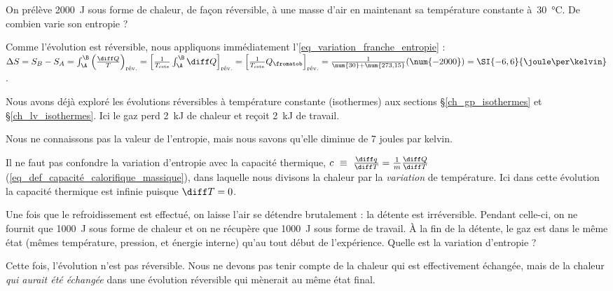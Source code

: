 		\begin{anexample}
		\label{exemple_delta_entropie_basics}
			On prélève \SI{2000}{\joule} sous forme de chaleur, de façon réversible, à une masse d’air en maintenant sa température constante à~\SI{30}{\degreeCelsius}. De combien varie son entropie ?
				\begin{answer}
					Comme l’évolution est réversible, nous appliquons immédiatement l’\cref{eq_variation_franche_entropie} : $\Delta S
						= S_B - S_A
						= \int_\A^\B \left( \frac{\diff Q}{T} \right)_\text{rév.}
						= \left[\frac{1}{T_\text{cste}} \int_\A^\B \diff Q \right]_\text{rév.}
						= \left[\frac{1}{T_\text{cste}} Q_\fromatob \right]_\text{rév.}
						= \frac{1}{\num{30} + \num{273,15}} (\num{-2000})
						= \SI{-6,6}{\joule\per\kelvin}$.
					\begin{remark}Nous avons déjà exploré les évolutions réversibles à température constante (isothermes) aux sections \S\ref{ch_gp_isothermes} et \S\ref{ch_lv_isothermes}. Ici le gaz perd \SI{2}{\kilo\joule} de chaleur et reçoit \SI{2}{\kilo\joule} de travail.\end{remark}
					\begin{remark}Nous ne connaissons pas la valeur de l’entropie, mais nous savons qu’elle diminue de 7 \si{joules} par \si{kelvin}.\end{remark}
					\begin{remark}Il ne faut pas confondre la variation d’entropie avec la capacité thermique, $c\ \equiv \ \frac{\diff q}{\diff T} = \frac{1}{m} \frac{\diff Q}{\diff T}$ (\ref{eq_def_capacité_calorifique_massique}), dans laquelle nous divisons la chaleur par la \emph{variation} de température. Ici dans cette évolution la capacité thermique est infinie puisque $\diff T = 0$.\end{remark}
				\end{answer}
			
			Une fois que le refroidissement est effectué, on laisse l’air se détendre brutalement : la détente est irréversible. Pendant celle-ci, on ne fournit que \SI{1000}{\joule} sous forme de chaleur et on ne récupère que \SI{1000}{\joule} sous forme de travail. À la fin de la détente, le gaz est dans le même état (mêmes température, pression, et énergie interne) qu’au tout début de l’expérience. Quelle est la variation d’entropie ?
				\begin{answer} Cette fois, l’évolution n’est pas réversible. Nous ne devons pas tenir compte de la chaleur qui est effectivement échangée, mais de la chaleur \emph{qui aurait été échangée} dans une évolution réversible qui mènerait au même état final.
				

\end{answer}
\end{anexample}
